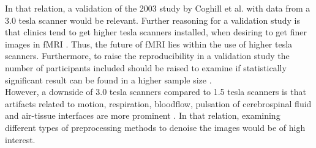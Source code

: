 In that relation, a validation of the 2003 study by Coghill et al. \cite{Coghill2003} with data from a 3.0 tesla scanner would be relevant. Further reasoning for a validation study is that clinics tend to get higher tesla scanners installed, when desiring to get finer images in fMRI \cite{Wood2012}. Thus, the future of fMRI lies within the use of higher tesla scanners. Furthermore, to raise the reproducibility in a validation study the number of participants included should be raised to examine if statistically significant result can be found in a higher sample size \cite{Dubois2016, Button2013}. \\
However, a downside of 3.0 tesla scanners compared to 1.5 tesla scanners is that artifacts related to motion, respiration, bloodflow, pulsation of cerebrospinal fluid and air-tissue interfaces are more prominent \cite{Wood2012}. In that relation, examining different types of preprocessing methods to denoise the images would be of high interest. 
